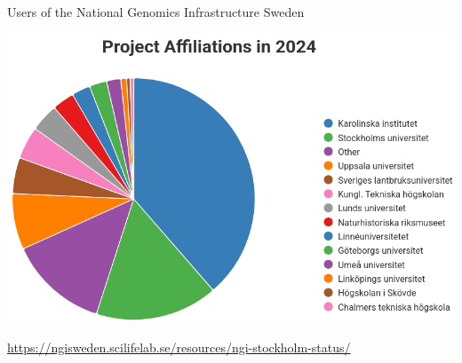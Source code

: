 \documentclass[10pt]{beamer}
\newcommand{\credit}[1]{{\vspace{\fill} \par \raggedleft \scriptsize \mdseries \color{mDarkBrown} #1 \par}}
\begin{document}
\begin{frame}{Users of the National Genomics Infrastructure Sweden}
	\begin{center}
		\hspace*{-1cm}
		\includegraphics[height=0.7\textheight]{./figures/ngi-users-2024.png}
	\end{center}
	\credit{\href{https://ngisweden.scilifelab.se/resources/ngi-stockholm-status/}{https://ngisweden.scilifelab.se/resources/ngi-stockholm-status/}}
\end{frame}
\end{document}
